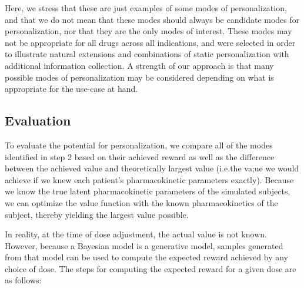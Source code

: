 Here, we stress that these are just examples of some modes of personalization, and that we do not mean that these modes should always be candidate modes for personalization, nor that they are the only modes of interest.  These modes may not be appropriate for all drugs across all indications, and were selected in order to illustrate natural extensions and combinations of static personalization with additional information collection. A strength of our approach is that many possible modes of personalization may be considered depending on what is appropriate for the use-case at hand.

\subsection{Evaluation}

To evaluate the potential for personalization, we compare all of the modes identified in step 2 based on their achieved reward as well as the difference between the achieved value and theoretically largest value (i.e.the va;ue we would achieve if we knew each patient's pharmacokinetic parameters exactly). Because we know the true latent pharmacokinetic parameters of the simulated subjects, we can optimize the value function with the known pharmacokinetics of the subject, thereby yielding the largest value possible.

In reality, at the time of dose adjustment, the actual value is not known.  However, because a Bayesian model is a generative model, samples generated from that model can be used to compute the expected reward achieved by any choice of dose.  The steps for computing the expected reward for a given dose are as follows:

